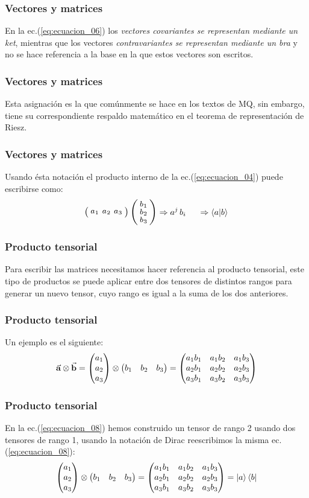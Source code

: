 \documentclass[12pt]{beamer}
\begin{document}
\begin{frame}
\frametitle{Vectores y matrices}
En la ec.(\ref{eq:ecuacion_06}) los \emph{vectores covariantes se representan mediante un ket}, mientras que los vectores \emph{contravariantes se representan mediante un bra} y no se hace referencia a la base en la que estos vectores son escritos.
\end{frame}
\begin{frame}
\frametitle{Vectores y matrices}
Esta asignación es la que comúnmente se hace en los textos de MQ, sin embargo, tiene su correspondiente respaldo matemático en el teorema de representación de Riesz.
\end{frame}
\begin{frame}
\frametitle{Vectores y matrices}
Usando ésta notación el producto interno de la ec.(\ref{eq:ecuacion_04}) puede escribirse como:
\begin{equation}
\resizebox{0.25\hsize}{!}{%
$\smqty(\xmat*{a}{1}{3}) \, \smqty(\xmat*{b}{3}{1})$%
} \Rightarrow a^{j} \, b_{i} \hspace{0.5cm} \Rightarrow \braket{a}{b}
\label{eq:ecuacion_07}
\end{equation}
\end{frame}
\begin{frame}
\frametitle{Producto tensorial}
Para escribir las matrices necesitamos hacer referencia al producto tensorial, este tipo de productos se puede aplicar entre dos tensores de distintos rangos para generar un nuevo tensor, cuyo rango es igual a la suma de los dos anteriores.
\end{frame}
\begin{frame}
\frametitle{Producto tensorial}
Un ejemplo es el siguiente:
\fontsize{12}{12}\selectfont
\begin{align}
\va{a} \otimes \va{b} = 
\mqty(a_{1} \\ a_{2} \\ a_{3}) \otimes \mqty(b_{1} & b_{2} & b_{3}) = \mqty(
a_{1} b_{1} & a_{1} b_{2} & a_{1} b_{3} \\
a_{2} b_{1} & a_{2} b_{2} & a_{2} b_{3} \\
a_{3} b_{1} & a_{3} b_{2} & a_{3} b_{3}
)
\label{eq:ecuacion_08}
\end{align}
\end{frame}
\begin{frame}
\frametitle{Producto tensorial}
En la ec.(\ref{eq:ecuacion_08}) hemos construido un tensor de rango 2 usando dos tensores de rango 1, usando la notación de Dirac reescribimos la misma ec.(\ref{eq:ecuacion_08}):
\pause
\fontsize{12}{12}\selectfont
\begin{align}
\mqty(a_{1} \\ a_{2} \\ a_{3}) \otimes \mqty(b_{1} & b_{2} & b_{3}) = \mqty(
a_{1} b_{1} & a_{1} b_{2} & a_{1} b_{3} \\
a_{2} b_{1} & a_{2} b_{2} & a_{2} b_{3} \\
a_{3} b_{1} & a_{3} b_{2} & a_{3} b_{3}
) = \ket{a} \bra{b}
\label{eq:ecuacion_09}
\end{align}
\end{frame}
\end{document}
